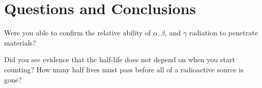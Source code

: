 \section {Questions and Conclusions}
Were you able to confirm the relative ability of $\alpha, \beta$, and $\gamma$ radiation to penetrate materials?

Did you see evidence that the half-life does not depend on when you start counting? How many half lives must pass before all of a radioactive source is gone? 

\endinput
